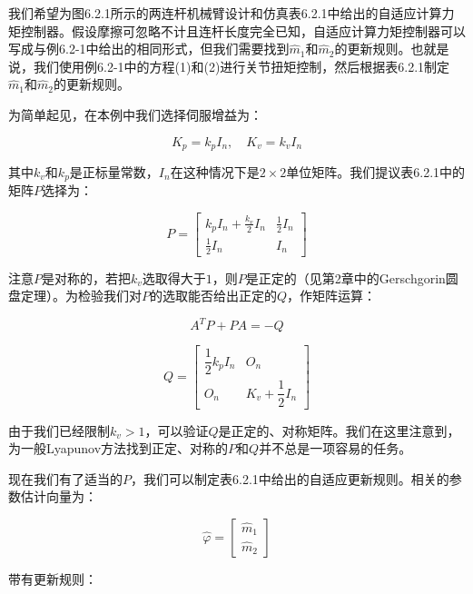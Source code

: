 \documentclass[12pt,a4paper]{ctexart}
\begin{document}
我们希望为图6.2.1所示的两连杆机械臂设计和仿真表6.2.1中给出的自适应计算力矩控制器。假设摩擦可忽略不计且连杆长度完全已知，自适应计算力矩控制器可以写成与例6.2-1中给出的相同形式，但我们需要找到$\hat{m}_1$和$\hat{m}_2$的更新规则。也就是说，我们使用例6.2-1中的方程(1)和(2)进行关节扭矩控制，然后根据表6.2.1制定$\hat{m}_1$和$\hat{m}_2$的更新规则。

为简单起见，在本例中我们选择伺服增益为：

\begin{equation}
K_p = k_p I_n, \quad K_v = k_v I_n
\end{equation}

其中$k_v$和$k_p$是正标量常数，$I_n$在这种情况下是$2 \times 2$单位矩阵。我们提议表6.2.1中的矩阵$P$选择为：

\begin{equation}
P = \begin{bmatrix} k_p I_n + \frac{k_v}{2} I_n & \frac{1}{2} I_n \\ \frac{1}{2} I_n & I_n \end{bmatrix}
\end{equation}

注意$P$是对称的，若把$k_v$选取得大于$1$，则$P$是正定的（见第2章中的Gerschgorin圆盘定理）。为检验我们对$P$的选取能否给出正定的$Q$，作矩阵运算：

\begin{equation}\tag{3}
A^T P + PA = -Q
\end{equation}

\begin{equation}\tag{4}
Q = \begin{bmatrix} \dfrac{1}{2} k_p I_n & O_n \\ O_n & K_v + \dfrac{1}{2} I_n \end{bmatrix}
\end{equation}

由于我们已经限制$k_v > 1$，可以验证$Q$是正定的、对称矩阵。我们在这里注意到，为一般Lyapunov方法找到正定、对称的$P$和$Q$并不总是一项容易的任务。

现在我们有了适当的$P$，我们可以制定表6.2.1中给出的自适应更新规则。相关的参数估计向量为：

\begin{equation}
\hat{\varphi} = \begin{bmatrix} \hat{m}_1 \\ \hat{m}_2 \end{bmatrix}
\end{equation}

带有更新规则：
\end{document}
